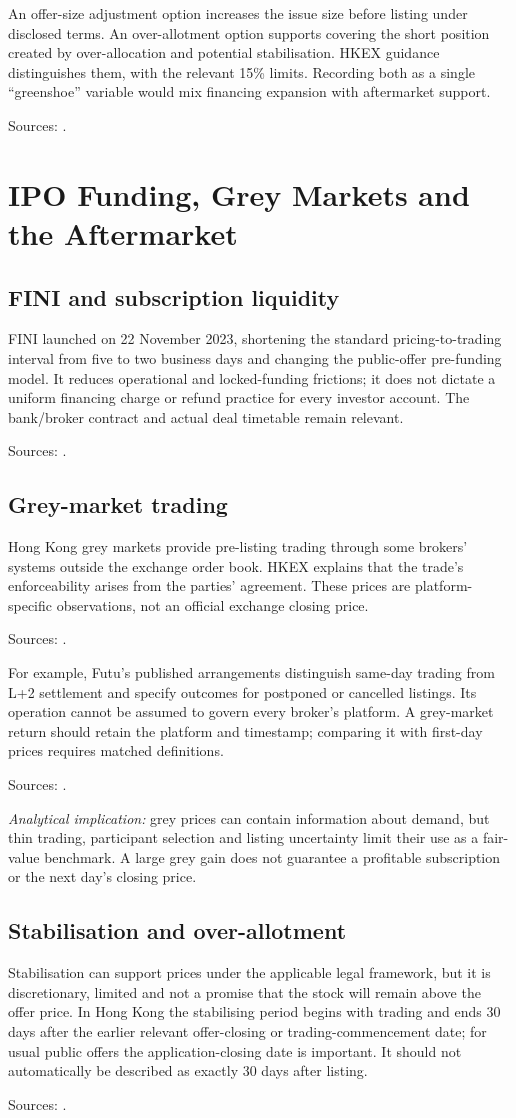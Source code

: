 \documentclass[11pt,a4paper]{article}
\newcommand{\source}[1]{\par{\footnotesize\color{ink}Sources: \cite{#1}.}\par}
\begin{document}
An offer-size adjustment option increases the issue size before listing under disclosed terms. An over-allotment option supports covering the short position created by over-allocation and potential stabilisation. HKEX guidance distinguishes them, with the relevant 15\% limits. Recording both as a single ``greenshoe'' variable would mix financing expansion with aftermarket support.\source{offeringannex}

\section{IPO Funding, Grey Markets and the Aftermarket}
\subsection{FINI and subscription liquidity}
FINI launched on 22 November 2023, shortening the standard pricing-to-trading interval from five to two business days and changing the public-offer pre-funding model. It reduces operational and locked-funding frictions; it does not dictate a uniform financing charge or refund practice for every investor account. The bank/broker contract and actual deal timetable remain relevant.\source{fini}

\subsection{Grey-market trading}
Hong Kong grey markets provide pre-listing trading through some brokers' systems outside the exchange order book. HKEX explains that the trade's enforceability arises from the parties' agreement. These prices are platform-specific observations, not an official exchange closing price.\source{greyhk}

For example, Futu's published arrangements distinguish same-day trading from L+2 settlement and specify outcomes for postponed or cancelled listings. Its operation cannot be assumed to govern every broker's platform. A grey-market return should retain the platform and timestamp; comparing it with first-day prices requires matched definitions.\source{greyoperator}

\textit{Analytical implication:} grey prices can contain information about demand, but thin trading, participant selection and listing uncertainty limit their use as a fair-value benchmark. A large grey gain does not guarantee a profitable subscription or the next day's closing price.

\subsection{Stabilisation and over-allotment}
Stabilisation can support prices under the applicable legal framework, but it is discretionary, limited and not a promise that the stock will remain above the offer price. In Hong Kong the stabilising period begins with trading and ends 30 days after the earlier relevant offer-closing or trading-commencement date; for usual public offers the application-closing date is important. It should not automatically be described as exactly 30 days after listing.\source{stabilisation}
\end{document}
